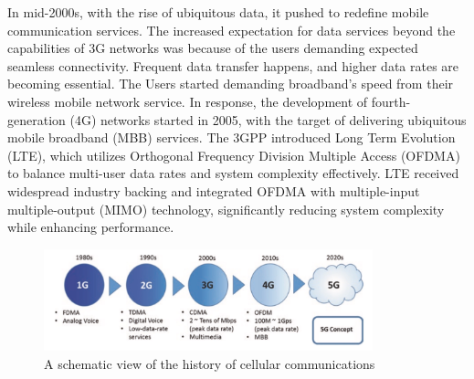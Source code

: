 \documentclass{report}
\begin{document}
In mid-2000s, with the rise of ubiquitous data, it pushed to redefine mobile communication services. The increased expectation for data services beyond the capabilities of 3G networks was because of the users demanding expected seamless connectivity. Frequent data transfer happens, and higher data rates are becoming essential. The Users started demanding broadband’s speed from their wireless mobile network service.
In response, the development of fourth-generation (4G) networks started in 2005, with the target of delivering ubiquitous mobile broadband (MBB) services. The 3GPP introduced Long Term Evolution (LTE), which utilizes Orthogonal Frequency Division Multiple Access (OFDMA) to balance multi-user data rates and system complexity effectively. LTE received widespread industry backing and integrated OFDMA with multiple-input multiple-output (MIMO) technology, significantly reducing system complexity while enhancing performance.

\begin{figure}[h]
    \centering
    \includegraphics[width=0.85\textwidth]{figures/1gto5g.png}
    \caption{A schematic view of the history of cellular communications}
    \label{fig:history1gto5g}
\end{figure}
\end{document}

